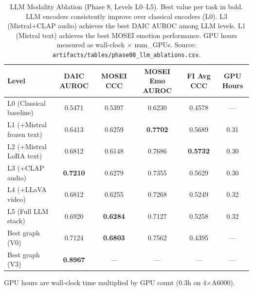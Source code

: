 \begin{table}[htbp]
\centering
\caption{LLM Modality Ablation (Phase 8, Levels L0--L5). Best value per task in bold. LLM encoders consistently improve over classical encoders (L0). L3 (Mistral+CLAP audio) achieves the best DAIC AUROC among LLM levels. L1 (Mistral text) achieves the best MOSEI emotion performance. GPU hours measured as wall-clock $\times$ num\_GPUs. Source: \texttt{artifacts/tables/phase08\_llm\_ablations.csv}.}
\label{tab:llm_ablation}
\begin{tabular}{lccccc}
\toprule
Level & DAIC AUROC & MOSEI CCC & MOSEI Emo AUROC & FI Avg CCC & GPU Hours \\
\midrule
L0 (Classical baseline) & 0.5471 & 0.5397 & 0.6230 & 0.4578 & --- \\
L1 (+Mistral frozen text) & 0.6413 & 0.6259 & \textbf{0.7702} & 0.5689 & 0.31 \\
L2 (+Mistral LoRA text) & 0.6812 & 0.6148 & 0.7686 & \textbf{0.5732} & 0.30 \\
L3 (+CLAP audio) & \textbf{0.7210} & 0.6279 & 0.7355 & 0.5629 & 0.30 \\
L4 (+LLaVA video) & 0.6812 & 0.6255 & 0.7268 & 0.5249 & 0.32 \\
L5 (Full LLM stack) & 0.6920 & \textbf{0.6284} & 0.7127 & 0.5258 & 0.32 \\
\midrule
Best graph (V0) & 0.7124 & \textbf{0.6803} & 0.7562 & 0.4395 & --- \\
Best graph (V3) & \textbf{0.8967} & --- & --- & --- & --- \\
\bottomrule
\end{tabular}
\vspace{4pt}
{\small GPU hours are wall-clock time multiplied by GPU count (0.3h on 4$\times$A6000).}
\end{table}
